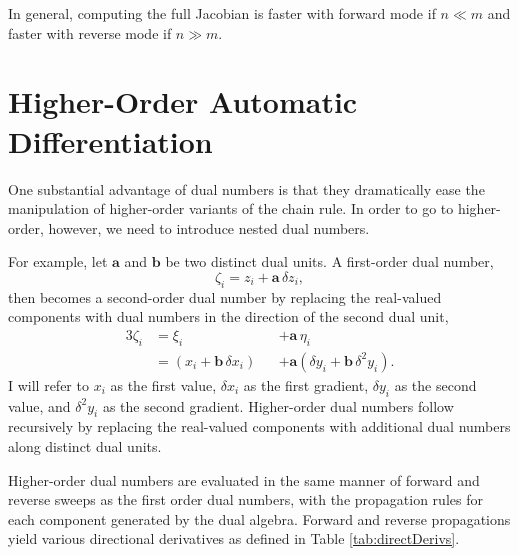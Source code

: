 \documentclass[11pt]{article}
\begin{document}
In general, computing the full Jacobian is faster with forward mode if $n \ll m$ 
and faster with reverse mode if $n \gg m$.

\section*{Higher-Order Automatic Differentiation}

One substantial advantage of dual numbers is that they dramatically ease the
manipulation of higher-order variants of the chain rule.  In order to go to 
higher-order, however, we need to introduce nested dual numbers.

For example, let $\mathbf{a}$ and $\mathbf{b}$ be two distinct dual units.
A first-order dual number,
%
\begin{equation*}
\zeta_{i} = z_{i} + \mathbf{a} \, \delta z_{i},
\end{equation*}
%
then becomes a second-order dual number by replacing the 
real-valued components with dual numbers in the direction of the second 
dual unit,
%
\begin{alignat*}{3}
\zeta_{i} 
&=
\xi_{i} 
&&+ \mathbf{a} \, \eta_{i}
\\
&=
\left( x_{i} + \mathbf{b} \, \delta x_{i} \right)
&&+ \mathbf{a} \left( \delta y_{i} + \mathbf{b} \, \delta^{2} y_{i} \right).
\end{alignat*}
%
I will refer to $x_{i}$ as the first value, $\delta x_{i}$ as the first gradient, 
$\delta y_{i}$ as the second value, and $\delta^{2} y_{i}$
as the second gradient.  Higher-order dual numbers follow recursively 
by replacing the real-valued components with additional dual numbers along 
distinct dual units.

Higher-order dual numbers are evaluated in the same manner of forward and 
reverse sweeps as the first order dual numbers, with the propagation rules
for each component generated by the dual algebra.  Forward and reverse
propagations yield various directional derivatives as defined in Table \ref{tab:directDerivs}.
\end{document}
